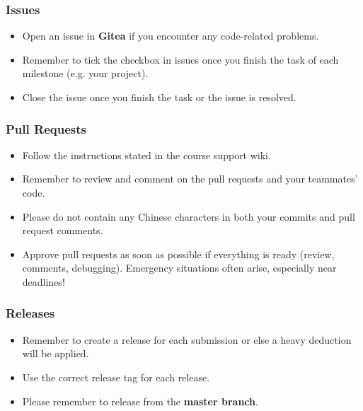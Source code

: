 \documentclass[
	11pt, %
]{beamer}
\begin{document}
\begin{frame}
	\frametitle{Issues}
 
	\begin{itemize}
    \item Open an issue in \textbf{Gitea} if you encounter any code-related problems.
    \item Remember to tick the checkbox in issues once you finish the task of each milestone (e.g. your project).
    \item Close the issue once you finish the task or the issue is resolved.
\end{itemize}

\end{frame}



\begin{frame}
	\frametitle{Pull Requests}
 
	\begin{itemize}
    \item Follow the instructions stated in the course support wiki.
    \item Remember to review and comment on the pull requests and your teammates' code.
    \item Please do not contain any Chinese characters in both your commits and pull request comments.
    \item Approve pull requests as soon as possible if everything is ready (review, comments, debugging). Emergency situations often arise, especially near deadlines!
\end{itemize}

\end{frame}



\begin{frame}
	\frametitle{Releases}
 
	\begin{itemize}
    \item Remember to create a release for each submission or else a heavy deduction will be applied.
    \item Use the correct release tag for each release.
    \item Please remember to release from the \textbf{master branch}.
\end{itemize}

\end{frame}
\end{document}
